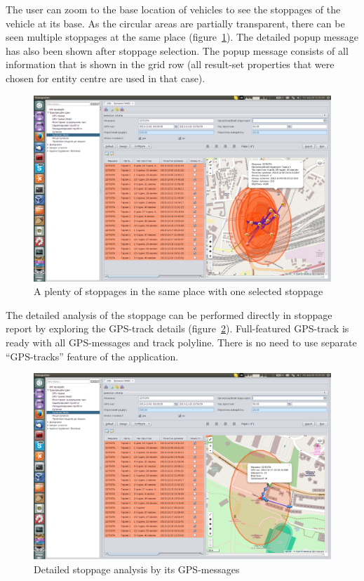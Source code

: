 \newpage 
The user can zoom to the base location of vehicles to see the stoppages of the vehicle at its base. As the circular areas are partially transparent, there can be seen multiple stoppages at the same place (figure~\ref{fig:24}). The detailed popup message has also been shown after stoppage selection. The popup message consists of all information that is shown in the grid row (all result-set properties that were chosen for entity centre are used in that case).

\begin{figure}[H]
\centering
\includegraphics[width=\linewidth]{chapters/03-stoppages/images/24-a-plenty-of-night-stoppages-in-the-same-place-with-one-selected-popup-details.png}
\caption{A plenty of stoppages in the same place with one selected stoppage}\label{fig:24}
\end{figure}

\newpage
The detailed analysis of the stoppage can be performed directly in stoppage report by exploring the GPS-track details (figure~\ref{fig:25}). Full-featured GPS-track is ready with all GPS-messages and track polyline. There is no need to use separate ``GPS-tracks'' feature of the application.

\begin{figure}[H]
\centering
\includegraphics[width=\linewidth]{chapters/03-stoppages/images/25-detailed-stoppage-analysis-by-its-messages.png}
\caption{Detailed stoppage analysis by its GPS-messages}\label{fig:25}
\end{figure}

